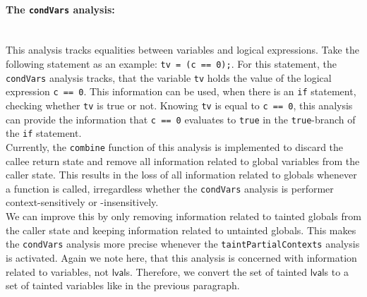       \paragraph{The \texttt{condVars} analysis:}\mbox{}\\
        This analysis tracks equalities between variables and logical expressions. Take the following statement as an example: \texttt{tv = (c == 0);}. For this statement, the \texttt{condVars} analysis tracks, that the variable \texttt{tv} holds the value of the logical expression \texttt{c == 0}. This information can be used, when there is an \texttt{if} statement, checking whether \texttt{tv} is true or not. Knowing \texttt{tv} is equal to \texttt{c == 0}, this analysis can provide the information that \texttt{c == 0} evaluates to \texttt{true} in the \texttt{true}-branch of the \texttt{if} statement.\\
        Currently, the \texttt{combine} function of this analysis is implemented to discard the callee return state and remove all information related to global variables from the caller state. This results in the loss of all information related to globals whenever a function is called, irregardless whether the \texttt{condVars} analysis is performer context-sensitively or -insensitively.\\
        We can improve this by only removing information related to tainted globals from the caller state and keeping information related to untainted globals. This makes the \texttt{condVars} analysis more precise whenever the \texttt{taintPartialContexts} analysis is activated. Again we note here, that this analysis is concerned with information related to variables, not $\textsf{lval}$s. Therefore, we convert the set of tainted $\textsf{lval}$s to a set of tainted variables like in the previous paragraph. 
      